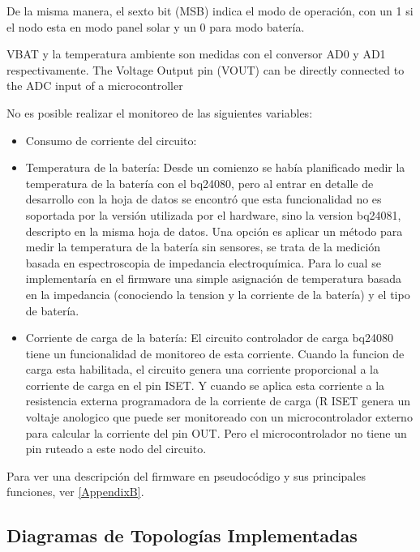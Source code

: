 {De la misma manera, el sexto bit (MSB) indica el modo de operación, con un 1 si el nodo esta en modo panel solar y un 0 para modo batería.

VBAT y la temperatura ambiente son medidas con el conversor AD0 y AD1 respectivamente.
The Voltage Output pin (VOUT) can be directly connected to the ADC input of a microcontroller

\noindent No es posible realizar el monitoreo de las siguientes variables:
\begin{itemize}
\item Consumo de corriente del circuito:

\item Temperatura de la batería: Desde un comienzo se había planificado medir la temperatura de la batería con el bq24080, pero al entrar en detalle de desarrollo con la hoja de datos se encontró que esta funcionalidad no es soportada por la versión utilizada por el hardware, sino la version bq24081, descripto en la misma hoja de datos. Una opción es aplicar un método para medir la temperatura de la batería sin sensores, se trata de la medición basada en espectroscopia de impedancia electroquímica\citep{metodo}. Para lo cual se implementaría en el firmware una simple asignación de temperatura basada en la impedancia (conociendo la tension y la corriente de la batería) y el tipo de batería.

\item Corriente de carga de la batería: El circuito controlador de carga bq24080 tiene un funcionalidad de monitoreo de esta corriente. Cuando la funcion de carga esta habilitada, el circuito genera una corriente proporcional a la corriente de carga en el pin ISET.  Y cuando se aplica esta corriente a la resistencia externa programadora de la corriente de carga (R ISET genera un voltaje anologico que puede ser monitoreado con un microcontrolador externo para calcular la corriente del pin OUT. Pero el microcontrolador no tiene un pin ruteado a este nodo del circuito.

\end{itemize}


Para ver una descripción del firmware en pseudocódigo y sus principales funciones, ver \ref{AppendixB}.



\subsection{Diagramas de Topologías Implementadas}
\label{subsec:topo} 

}
